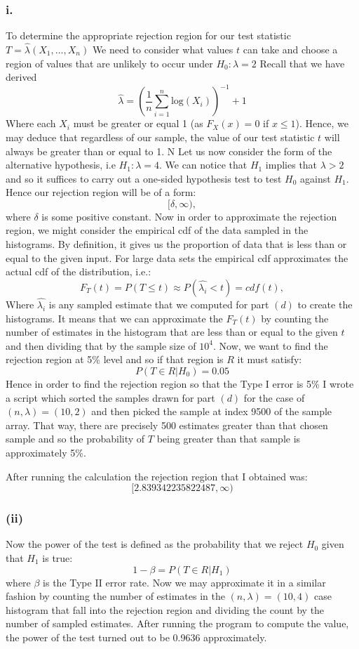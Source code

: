 \documentclass[12pt]{article}
\begin{document}
\subsubsection*{i.}
To determine the appropriate rejection region for our test statistic 
$ T = \hat{\lambda}(X_1, ..., X_n)$ We need to consider what values $ t $ can take and
choose a region of values that are unlikely to occur under $ H_0: \lambda = 2$
Recall that we have derived 
\[ \hat{\lambda} = \left(\frac{1}{n} \sum_{i = 1}^{n} \text{log} (X_i) \right)^{-1} + 1  \]
Where each $ X_i $ must be greater or equal 1 (as $F_X(x) = 0$ if $ x \leq 1$).
Hence, we may deduce that regardless of our sample, the value of our test statistic
$ t $ will always be greater than or equal to 1. N
Let us now consider the form of the alternative hypothesis, i.e $ H_1: \lambda = 4$. We can notice that $H_1$ implies that $ \lambda > 2 $ and so it suffices to carry out a one-sided hypothesis test to test $H_0$ against $H_1$. 
Hence our rejection region will be of a form:
\[[\delta, \infty), \]
where $\delta$ is  some positive constant. Now in order to approximate the rejection region, we might consider the empirical cdf of the data sampled in the histograms. 
By definition, it gives us the proportion of data that is less than or equal to the given input. For large data sets the empirical cdf approximates the actual cdf of the distribution, i.e.:
\[ F_T(t) = P(T \leq t) \approx P(\hat{\lambda_i} < t) = cdf(t), \]
Where $\hat{\lambda_i}$ is any sampled estimate that we computed for part $(d)$ to create the histograms. It means that we can approximate the 
$F_T(t)$ by counting the number of estimates in the histogram that are less than or equal to the given $t$ and then dividing that by the sample size of $10^4$. 
Now, we want to find the rejection region at 5\% level and so if that region is $R$ it must satisfy:
\[ P(T \in R | H_0) = 0.05 \]
Hence in order to find the rejection region so that the Type I error is 5\% I wrote a script which sorted the samples drawn for part $(d)$ for the case of $(n, \lambda) = (10, 2)$ and then picked the sample at index 9500 of the sample array. That way, there are precisely 500 estimates greater 
than that chosen sample and so the probability of $ T $ being greater than that sample is approximately 5\%.

After running the calculation the rejection region that I obtained was:
\[[2.839342235822487, \infty)\]

\subsubsection*{(ii)}
Now the power of the test is defined as the probability that we reject $H_0$ given that $H_1$ is true:
\[ 1 - \beta = P(T \in R | H_1)\]
where $\beta$ is the Type II error rate. 
Now we may approximate it in a similar fashion by counting the number of estimates in the $(n, \lambda) = (10, 4)$ case histogram that fall into the rejection region and dividing the count by the number of sampled estimates.
After running the program to compute the value, the power of the test turned out to be 0.9636 approximately. 
\end{document}
